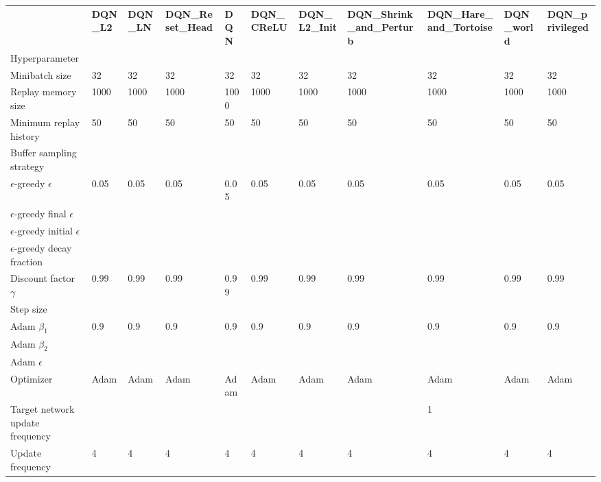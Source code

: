 \begin{tabular}{lllllllllll}
 & \bfseries DQN_L2 & \bfseries DQN_LN & \bfseries DQN_Reset_Head & \bfseries DQN & \bfseries DQN_CReLU & \bfseries DQN_L2_Init & \bfseries DQN_Shrink_and_Perturb & \bfseries DQN_Hare_and_Tortoise & \bfseries DQN_world & \bfseries DQN_privileged \\
Hyperparameter &  &  &  &  &  &  &  &  &  &  \\
Minibatch size & 32 & 32 & 32 & 32 & 32 & 32 & 32 & 32 & 32 & 32 \\
Replay memory size & 1000 & 1000 & 1000 & 1000 & 1000 & 1000 & 1000 & 1000 & 1000 & 1000 \\
Minimum replay history & 50 & 50 & 50 & 50 & 50 & 50 & 50 & 50 & 50 & 50 \\
Buffer sampling strategy &  &  &  &  &  &  &  &  &  &  \\
$\epsilon$-greedy $\epsilon$ & 0.05 & 0.05 & 0.05 & 0.05 & 0.05 & 0.05 & 0.05 & 0.05 & 0.05 & 0.05 \\
$\epsilon$-greedy final $\epsilon$ &  &  &  &  &  &  &  &  &  &  \\
$\epsilon$-greedy initial $\epsilon$ &  &  &  &  &  &  &  &  &  &  \\
$\epsilon$-greedy decay fraction &  &  &  &  &  &  &  &  &  &  \\
Discount factor $\gamma$ & 0.99 & 0.99 & 0.99 & 0.99 & 0.99 & 0.99 & 0.99 & 0.99 & 0.99 & 0.99 \\
Step size &  &  &  &  &  &  &  &  &  &  \\
Adam $\beta_1$ & 0.9 & 0.9 & 0.9 & 0.9 & 0.9 & 0.9 & 0.9 & 0.9 & 0.9 & 0.9 \\
Adam $\beta_2$ &  &  &  &  &  &  &  &  &  &  \\
Adam $\epsilon$ &  &  &  &  &  &  &  &  &  &  \\
Optimizer & Adam & Adam & Adam & Adam & Adam & Adam & Adam & Adam & Adam & Adam \\
Target network update frequency &  &  &  &  &  &  &  & 1 &  &  \\
Update frequency & 4 & 4 & 4 & 4 & 4 & 4 & 4 & 4 & 4 & 4 \\
\end{tabular}
